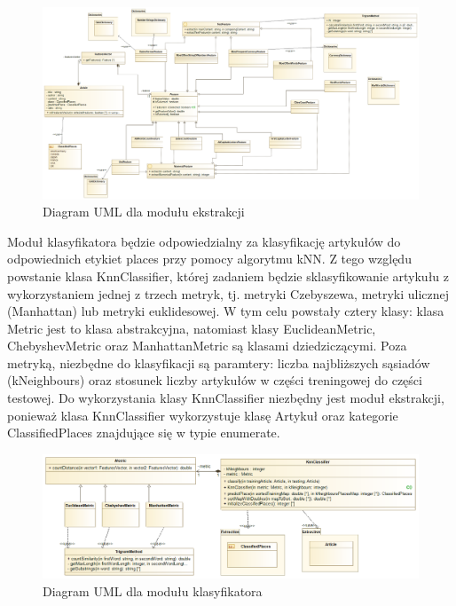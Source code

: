 \documentclass{classrep}
\begin{document}
\begin{figure}[H]
    \centering
    \includegraphics[width=15cm]{modul_ekstrakcji.png}
    \caption{Diagram UML dla modułu ekstrakcji}
\end{figure}


\indent Moduł klasyfikatora będzie odpowiedzialny za klasyfikację artykułów do odpowiednich etykiet places przy pomocy algorytmu kNN. Z tego względu powstanie klasa KnnClassifier, której zadaniem będzie sklasyfikowanie artykułu z wykorzystaniem jednej z trzech metryk, tj. metryki Czebyszewa, metryki ulicznej (Manhattan) lub metryki euklidesowej. W tym celu powstały cztery klasy: klasa Metric jest to klasa abstrakcyjna, natomiast klasy EuclideanMetric, ChebyshevMetric oraz ManhattanMetric są klasami dziedziczącymi. Poza metryką, niezbędne do klasyfikacji są paramtery: liczba najbliższych sąsiadów (kNeighbours) oraz stosunek liczby artykułów w części treningowej do części testowej. Do wykorzystania klasy KnnClassifier niezbędny jest moduł ekstrakcji, ponieważ klasa KnnClassifier wykorzystuje klasę Artykuł oraz kategorie ClassifiedPlaces znajdujące się w typie enumerate. \\
\begin{figure}[H]
    \centering
    \includegraphics[width=15cm]{modul_klasyfikatora.png}
    \caption{Diagram UML dla modułu klasyfikatora}
\end{figure}
\end{document}
